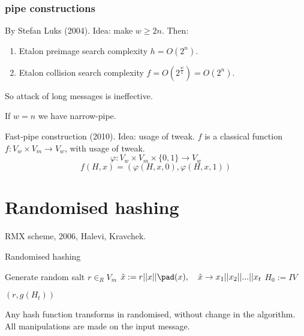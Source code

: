 \subsubsection*{pipe constructions}

\begin{definition}
    By Stefan Luks (2004). Idea: make $w \geqslant 2n$. Then:
    \begin{enumerate}
        \item Etalon preimage search complexity $h = O(2^n)$.
        \item Etalon collision search complexity $f = O(2^{\frac{w}{1}}) = O(2^n)$.
    \end{enumerate}
    So attack of long messages is ineffective.
\end{definition}

\begin{definition}
    If $w = n$ we have narrow-pipe.
\end{definition}

\begin{definition}
    Fast-pipe construction (2010). Idea: usage of tweak.
    $f$ is a classical function $f: V_w \times V_m \rightarrow V_w$, with usage of tweak.
    $$\varphi: V_w \times V_m \times \{0, 1\} \rightarrow V_w$$
    $$f(H, x) = (\varphi(H, x, 0), \varphi(H, x, 1))$$
\end{definition}

\section{Randomised hashing}

RMX scheme, 2006, Halevi, Kravchek.

\begin{algorithm2e}[ht]
    \caption{Randomised hashing}
    

    Generate random salt $r \in_{R} V_m$\;
    $\Tilde{x} := r || x || \pad(x), \quad \Tilde{x} \rightarrow x_1 || x_2 || ... || x_t$\;
    $H_0 := IV$\;
    
    \Return $(r, g(H_t))$\;
\end{algorithm2e}

\begin{remark}
    Any hash function transforms in randomised, without change in the algorithm.
    All manipulations are made on the input message. 
\end{remark}

